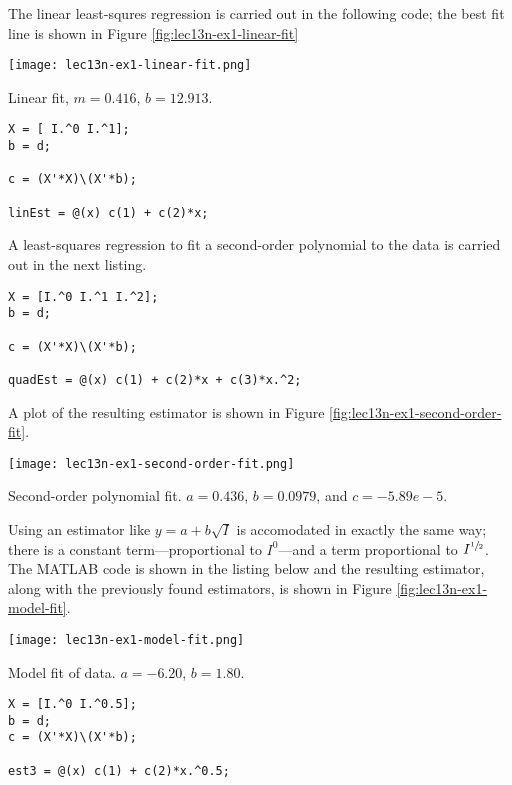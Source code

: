 The linear least-squres regression is carried out in the following code; the best fit line is shown in Figure \ref{fig:lec13n-ex1-linear-fit}
\begin{marginfigure}
\texttt{[image: lec13n-ex1-linear-fit.png]}
\caption{Linear fit, $m=0.416$, $b=12.913$.}
\label{fig:lec13n-ex1-linear-fit}
\end{marginfigure}
\begin{lstlisting}[name=lec13n-ex1, style=myMatlab]
X = [ I.^0 I.^1];
b = d;

c = (X'*X)\(X'*b);

linEst = @(x) c(1) + c(2)*x;
\end{lstlisting}
A least-squares regression to fit a second-order polynomial to the data is carried out in the next listing.
\begin{lstlisting}[name=lec13n-ex1,style=myMatlab]
X = [I.^0 I.^1 I.^2];
b = d;

c = (X'*X)\(X'*b);

quadEst = @(x) c(1) + c(2)*x + c(3)*x.^2;
\end{lstlisting}
A plot of the resulting estimator is shown in Figure \ref{fig:lec13n-ex1-second-order-fit}.
\begin{marginfigure}
\texttt{[image: lec13n-ex1-second-order-fit.png]}
\caption{Second-order polynomial fit. $a=0.436$, $b=0.0979$, and $c=-5.89e-5$.}
\label{fig:lec13n-ex1-second-order-fit}  
\end{marginfigure}
Using an estimator like $y = a + b\sqrt{I}$ is accomodated in exactly the same way; there is a constant term---proportional to $I^{0}$---and a term proportional to $I^{\sfrac{1}{2}}$.  The MATLAB code is shown in the listing below and the resulting estimator, along with the previously found estimators, is shown in Figure \ref{fig:lec13n-ex1-model-fit}.

\begin{marginfigure}
\texttt{[image: lec13n-ex1-model-fit.png]}
\caption{Model fit of data.  $a = -6.20$, $b=1.80$.} 
\label{fig:lec13n-ex1-model-fit}
\end{marginfigure}

\begin{lstlisting}[style=myMatlab,name=lec13n-ex1]
X = [I.^0 I.^0.5];
b = d;
c = (X'*X)\(X'*b);

est3 = @(x) c(1) + c(2)*x.^0.5;
\end{lstlisting}

